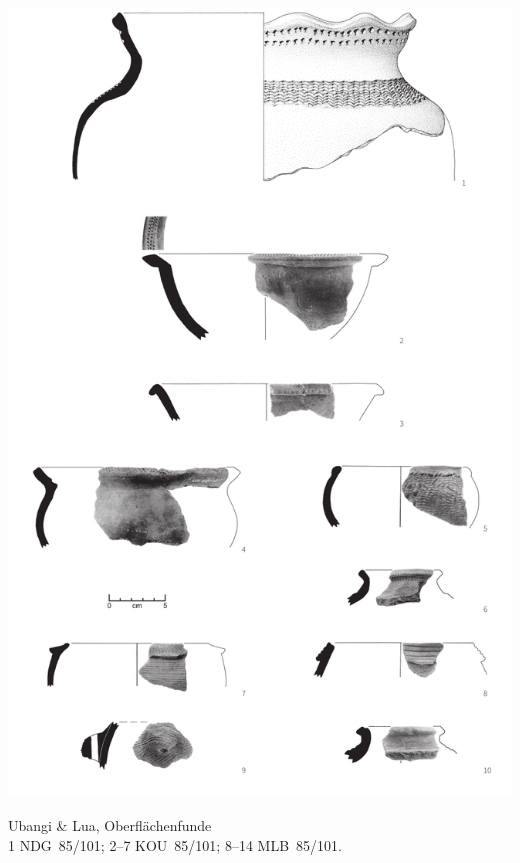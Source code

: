 \begin{pl}[H]
	\includegraphics{plt/Taf24.pdf}
	\vspace{.75em}\caption{\mbox{Ubangi} \& Lua, Oberflächenfunde \\ 1 NDG~85/101; 2--7 KOU~85/101; 8--14 MLB~85/101.}
	\label{pl:24}
\end{pl}

